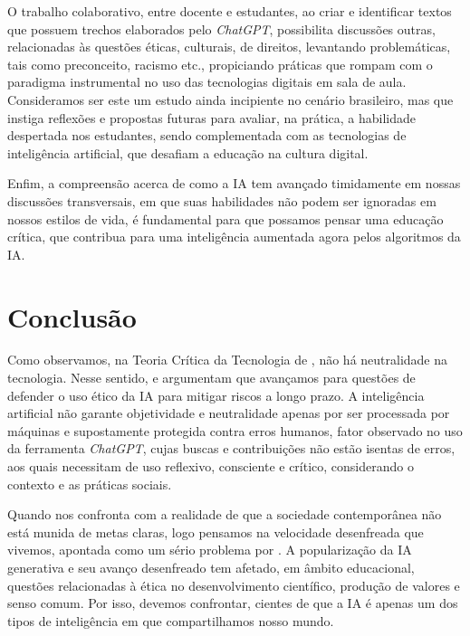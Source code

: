 \documentclass[portuguese]{textolivre}
\begin{document}
O trabalho colaborativo, entre docente e estudantes, ao criar e identificar textos que possuem trechos elaborados pelo \emph{ChatGPT}, possibilita discussões outras, relacionadas às questões éticas, culturais, de direitos, levantando problemáticas, tais como preconceito, racismo etc., propiciando práticas que rompam com o paradigma instrumental \cite{feenberg2004} no uso das tecnologias digitais em sala de aula. Consideramos ser este um estudo ainda incipiente no cenário brasileiro, mas que instiga reflexões e propostas futuras para avaliar, na prática, a habilidade despertada nos estudantes, sendo complementada com as tecnologias de inteligência artificial, que desafiam a educação na cultura digital.

Enfim, a compreensão acerca de como a IA tem avançado timidamente em nossas discussões transversais, em que suas habilidades não podem ser ignoradas em nossos estilos de vida, é fundamental para que possamos pensar uma educação crítica, que contribua para uma inteligência aumentada agora pelos algoritmos da IA. 


\section{Conclusão}

Como observamos, na Teoria Crítica da Tecnologia de \textcite{feenberg2003, feenberg2004}, não há neutralidade na tecnologia. Nesse sentido, \textcite{kaufman2021} e \textcite{coeckelbergh2020ai} argumentam que avançamos para questões de defender o uso ético da IA para mitigar riscos a longo prazo. A inteligência artificial não garante objetividade e neutralidade apenas por ser processada por máquinas e supostamente protegida contra erros humanos, fator observado no uso da ferramenta \emph{ChatGPT}, cujas buscas e contribuições não estão isentas de erros, aos quais necessitam de uso reflexivo, consciente e crítico, considerando o contexto e as práticas sociais.

Quando \textcite{feenberg2003} nos confronta com a realidade de que a sociedade contemporânea não está munida de metas claras, logo pensamos na velocidade desenfreada que vivemos, apontada como um sério problema por \textcite{bauman2013cultura}. A popularização da IA generativa e seu avanço desenfreado tem afetado, em âmbito educacional, questões relacionadas à ética no desenvolvimento científico, produção de valores e senso comum. Por isso, devemos confrontar, cientes de que a IA é apenas um dos tipos de inteligência em que compartilhamos nosso mundo.
\end{document}
